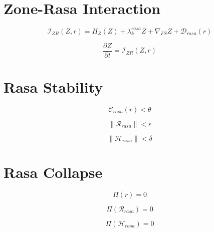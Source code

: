 \section*{Zone-Rasa Interaction}

\[
\mathcal{I}_{ZR}(Z, r)
= H_Z(Z)
+ \lambda_k^{rasa} Z
+ \nabla_{FS} Z
+ \mathcal{D}_{rasa}(r)
\]

\[
\frac{\partial Z}{\partial t}
= \mathcal{I}_{ZR}(Z, r)
\]


\section*{Rasa Stability}

\[
\mathcal{C}_{rasa}(r) < \theta
\]

\[
\|\mathcal{R}_{rasa}\| < \epsilon
\]

\[
\|\mathcal{H}_{rasa}\| < \delta
\]


\section*{Rasa Collapse}

\[
\Pi(r) = 0
\]

\[
\Pi(\mathcal{R}_{rasa}) = 0
\]

\[
\Pi(\mathcal{H}_{rasa}) = 0
\]

